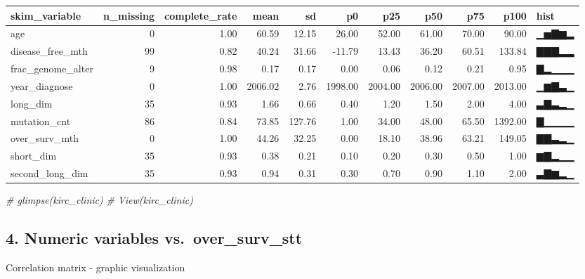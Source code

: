 \documentclass[]{article}
\newenvironment{Shaded}{\begin{snugshade}}{\end{snugshade}}
\newcommand{\CommentTok}[1]{\textcolor[rgb]{0.56,0.35,0.01}{\textit{#1}}}
\begin{document}
\begin{longtable}[]{@{}lrrrrrrrrrl@{}}
\toprule
skim\_variable & n\_missing & complete\_rate & mean & sd & p0 & p25 &
p50 & p75 & p100 & hist\tabularnewline
\midrule
\endhead
age & 0 & 1.00 & 60.59 & 12.15 & 26.00 & 52.00 & 61.00 & 70.00 & 90.00 &
▁▅▇▆▂\tabularnewline
disease\_free\_mth & 99 & 0.82 & 40.24 & 31.66 & -11.79 & 13.43 & 36.20
& 60.51 & 133.84 & ▇▇▇▂▂\tabularnewline
frac\_genome\_alter & 9 & 0.98 & 0.17 & 0.17 & 0.00 & 0.06 & 0.12 & 0.21
& 0.95 & ▇▂▁▁▁\tabularnewline
year\_diagnose & 0 & 1.00 & 2006.02 & 2.76 & 1998.00 & 2004.00 & 2006.00
& 2007.00 & 2013.00 & ▁▆▇▃▁\tabularnewline
long\_dim & 35 & 0.93 & 1.66 & 0.66 & 0.40 & 1.20 & 1.50 & 2.00 & 4.00 &
▃▇▃▂▁\tabularnewline
mutation\_cnt & 86 & 0.84 & 73.85 & 127.76 & 1.00 & 34.00 & 48.00 &
65.50 & 1392.00 & ▇▁▁▁▁\tabularnewline
over\_surv\_mth & 0 & 1.00 & 44.26 & 32.25 & 0.00 & 18.10 & 38.96 &
63.21 & 149.05 & ▇▇▃▂▁\tabularnewline
short\_dim & 35 & 0.93 & 0.38 & 0.21 & 0.10 & 0.20 & 0.30 & 0.50 & 1.00
& ▆▇▂▁▁\tabularnewline
second\_long\_dim & 35 & 0.93 & 0.94 & 0.31 & 0.30 & 0.70 & 0.90 & 1.10
& 2.00 & ▃▇▆▂▁\tabularnewline
\bottomrule
\end{longtable}

\begin{Shaded}
\begin{Highlighting}[]
\CommentTok{# glimpse(kirc_clinic)}
\CommentTok{# View(kirc_clinic)}
\end{Highlighting}
\end{Shaded}

\subsection{4. Numeric variables
vs.~over\_surv\_stt}\label{numeric-variables-vs.over_surv_stt}

Correlation matrix - graphic visualization
\end{document}
